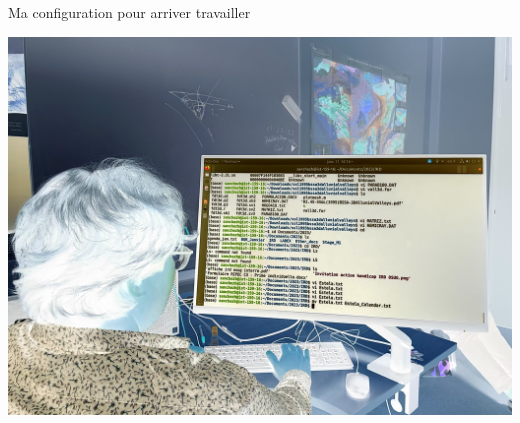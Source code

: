 \documentclass{beamer}
\begin{document}
\begin{frame}
 {Ma configuration pour arriver travailler}
 
  \includegraphics[width=1\linewidth]{images/photos/5/image1_neg.jpeg}  
 
\end{frame}
\end{document}
